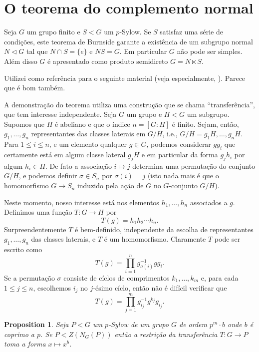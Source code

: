 \documentclass[12pt]{article}
\theoremstyle{plain}
\newtheorem{prop}[thm]{Proposition}
\theoremstyle{definition}
\newcommand{\ns}{\vartriangleleft}
\begin{document}
\section{O teorema do complemento normal}



Seja $G$ um grupo finito e $S < G$ um $p$-Sylow. Se $S$ satisfaz uma série de condições, este teorema de Burnside garante a  existência de um subgrupo normal $N \ns G$ tal que $N \cap S = \{e\}$ e $NS = G$. Em particular $G$ não pode ser simples. Além disso $G$ é apresentado como produto semidireto $G = N \ltimes S$.

Utilizei {\cite[Chapter 7]{Rotman2012}} como referência para o seguinte material (veja especialmente, {\cite[Theorem 7.50]{Rotman2012}}). Parece que {\cite[Chapter 5]{Isaacs2008}} é bom também.

A demonstração do teorema utiliza uma construção que se chama ``transferência'', que tem interesse independente. Seja $G$ um grupo e $H < G$ um subgrupo. Supomos que $H$ é abeliano e que o índice $n = [G : H]$ é finito. Sejam, então, $g_1, \ldots, g_n$ representantes das classes laterais em $G / H$, i.e., $G/H = {g_1H, \ldots, g_nH}$. Para $1 \leq i \leq n$, e um elemento qualquer $g \in G$, podemos considerar $gg_i$ que certamente está em algum classe lateral $g_{j} H$ e em particular da forma $g_j h_i$ por algum $h_i \in H$. De fato a associação $i \mapsto j$ determina uma permutação do conjunto $G / H$, e podemos definir $\sigma \in S_n$ por $\sigma(i) = j$ (isto nada mais é que o homomorfismo $G \rightarrow S_n$ induzido pela ação de $G$ no $G$-conjunto $G/H$).

Neste momento, nosso interesse está nos elementos $h_1, \ldots, h_n$ associados a $g$. Definimos uma função $T : G \rightarrow H$ por
\[
T(g) = h_1 h_2 \cdots h_n.
\]
Surpreendentemente $T$ é bem-definido, independente da escolha de representantes $g_1, \ldots, g_n$ das classes laterais, e $T$ é um homomorfismo. Claramente $T$ pode ser escrito como
\[
T(g) = \prod_{i=1}^n g_{\sigma(i)}^{-1} g g_i.
\]
Se a permutação $\sigma$ consiste de cíclos de comprimentos $k_1, \ldots, k_m$ e, para cada $1 \leq j \leq n$, escolhemos ${i_j}$ no $j$-ésimo cíclo, então não é difícil verificar que
\[
T(g) = \prod_{j=1}^m g_{i_j}^{-1} g^{k_j} g_{i_j}.
\]







\begin{prop}\label{prop:surjective transfer}
Seja $P < G$ um $p$-Sylow de um grupo $G$ de ordem $p^m \cdot b$ onde $b$ é coprimo a $p$. Se $P < Z(N_G(P))$ então a restrição da transferência $T : G \rightarrow P$ toma a forma $x \mapsto x^b$.
\end{prop}
\end{document}
